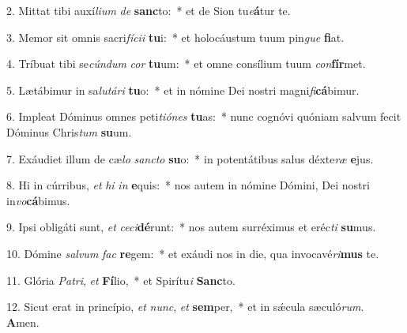 2. Mittat tibi auxí\textit{li}\textit{um} \textit{de} \textbf{sanc}to:~*  et de Sion tu\textit{e}\textbf{á}tur te.\

3. Memor sit omnis sacri\textit{fí}\textit{ci}\textit{i} \textbf{tu}i:~*  et holocáustum tuum pin\textit{gue} \textbf{fi}at.\

4. Tríbuat tibi se\textit{cún}\textit{dum} \textit{cor} \textbf{tu}um:~*  et omne consílium tuum \textit{con}\textbf{fír}met.\

5. Lætábimur in sa\textit{lu}\textit{tá}\textit{ri} \textbf{tu}o:~*  et in nómine Dei nostri magni\textit{fi}\textbf{cá}bimur.\

6. Impleat Dóminus omnes peti\textit{ti}\textit{ó}\textit{nes} \textbf{tu}as:~*  nunc cognóvi quóniam salvum fecit Dóminus Chris\textit{tum} \textbf{su}um.\

7. Exáudiet illum de cæ\textit{lo} \textit{sanc}\textit{to} \textbf{su}o:~*  in potentátibus salus déxte\textit{ræ} \textbf{e}jus.\

8. Hi in cúrribus, \textit{et} \textit{hi} \textit{in} \textbf{e}quis:~*  nos autem in nómine Dómini, Dei nostri in\textit{vo}\textbf{cá}bimus.\

9. Ipsi obligáti sunt, \textit{et} \textit{ce}\textit{ci}\textbf{dé}runt:~*  nos autem surréximus et eréc\textit{ti} \textbf{su}mus.\

10. Dómine \textit{sal}\textit{vum} \textit{fac} \textbf{re}gem:~*  et exáudi nos in die, qua invocavé\textit{ri}\textbf{mus} te.\

11. Glória \textit{Pa}\textit{tri}, \textit{et} \textbf{Fí}lio,~*  et Spirítu\textit{i} \textbf{Sanc}to.\

12. Sicut erat in princípio, \textit{et} \textit{nunc}, \textit{et} \textbf{sem}per,~*  et in sǽcula sæculó\textit{rum}. \textbf{A}men.\

